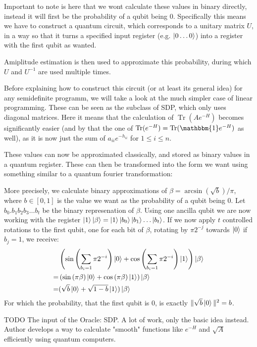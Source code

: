 \documentclass[11pt,a4paper]{scrartcl}
\DeclareMathOperator{\Tr}{Tr}
\begin{document}
Important to note is here that we wont calculate these values in binary directly, instead it will first be the probability of a qubit being 0. Specifically this means we have to construct a quantum circuit, which corresponds to a unitary matrix $U$, in a way so that it turns a specified input register (e.g. $\ket{0\ldots 0}$) into a register with the first qubit as wanted.

Amiplitude estimation is then used to approximate this probability, during which $U$ and $U^{-1}$ are used multiple times.

\vspace{1cm}

Before explaining how to construct this circuit (or at least its general idea) for any semidefinite programm, we will take a look at the much simpler case of linear programming. These can be seen as the subclass of SDP, which only uses diagonal matrices. Here it means that the calculation of $\Tr(Ae^{-H})$ becomes significantly easier (and by that the one of $\Tr(e^{-H})=\Tr(\mathbbm{1}e^{-H})$ as well), as it is now just the sum of $a_{ii}e^{-h_{ii}}$ for $1\leq i\leq n$.

These values can now be approximated classically, and stored as binary values in a quantum register. These can then be transformed into the form we want using something similar to a quantum fourier transformation:

More precisely, we calculate binary approximations of $\beta=\arcsin(\sqrt{b})/\pi$, where $b\in [0,1]$ is the value we want as the probability of a qubit being 0. Let $b_0.b_1b_2b_3\ldots b_t$ be the binary represenation of $\beta$. Using one ancilla qubit we are now working with the register $\ket{1}\ket{\beta}=\ket{1}\ket{b_0}\ket{b_1}\ldots\ket{b_t}$. If we now apply $t$ controlled rotations to the first qubit, one for each bit of $\beta$, rotating by $\pi 2^{-j}$ towards $\ket{0}$ if $b_j=1$, we receive:
\begin{align*}
&\left(\sin\left(\sum_{b_i=1} \pi 2^{-i}\right)\ket{0}
+\cos\left(\sum_{b_i=1} \pi 2^{-i}\right)\ket{1}\right)
 \ket{\beta}\\
=&\left(\sin\left(\pi\beta\right)\ket{0}
+\cos\left(\pi\beta\right)\ket{1}\right)
 \ket{\beta}\\
=&(\sqrt{b}\ket{0}+\sqrt{1-b}\ket{1})\ket{\beta}
\end{align*}
For which the probability, that the first qubit is 0, is exactly $\|\sqrt{b}\ket{0}\|^2=b$.

TODO The input of the Oracle: SDP. A lot of work, only the basic idea instead. Author develops a way to calculate "smooth" functions like $e^{-H}$ and $\sqrt{A}$ efficiently using quantum computers.
\end{document}

